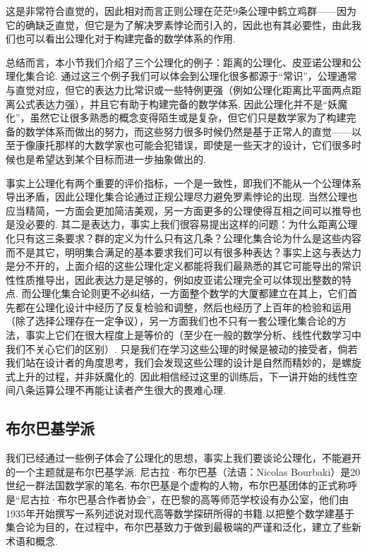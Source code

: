 这是非常符合直觉的，因此相对而言正则公理在茫茫9条公理中鹤立鸡群——因为它的确缺乏直觉，但它是为了解决罗素悖论而引入的，因此也有其必要性，由此我们也可以看出公理化对于构建完备的数学体系的作用.

总结而言，本小节我们介绍了三个公理化的例子：距离的公理化、皮亚诺公理和公理化集合论. 通过这三个例子我们可以体会到公理化很多都源于``常识''，公理通常与直觉对应，但它的表达力比常识或一些特例更强（例如公理化距离比平面两点距离公式表达力强），并且它有助于构建完备的数学体系. 因此公理化并不是``妖魔化''，虽然它让很多熟悉的概念变得陌生或是复杂，但它们只是数学家为了构建完备的数学体系而做出的努力，而这些努力很多时候仍然是基于正常人的直觉——以至于像康托那样的大数学家也可能会犯错误，即使是一些天才的设计，它们很多时候也是希望达到某个目标而进一步抽象做出的.

事实上公理化有两个重要的评价指标，一个是一致性，即我们不能从一个公理体系导出矛盾，因此公理化集合论通过正规公理尽力避免罗素悖论的出现. 当然公理也应当精简，一方面会更加简洁美观，另一方面更多的公理使得互相之间可以推导也是没必要的. 其二是表达力，事实上我们很容易提出这样的问题：为什么距离公理化只有这三条要求？群的定义为什么只有这几条？公理化集合论为什么是这些内容而不是其它，明明集合满足的基本要求我们可以有很多种表达？事实上这与表达力是分不开的，上面介绍的这些公理化定义都能将我们最熟悉的其它可能导出的常识性性质推导出，因此表达力是足够的，例如皮亚诺公理完全可以体现出整数的特点. 而公理化集合论则更不必纠结，一方面整个数学的大厦都建立在其上，它们首先都在公理化设计中经历了反复检验和调整，然后也经历了上百年的检验和运用（除了选择公理存在一定争议），另一方面我们也不只有一套公理化集合论的方法，事实上它们在很大程度上是等价的（至少在一般的数学分析、线性代数学习中我们不关心它们的区别）. 只是我们在学习这些公理的时候是被动的接受者，倘若我们站在设计者的角度思考，我们会发现这些公理的设计是自然而精妙的，是螺旋式上升的过程，并非妖魔化的. 因此相信经过这里的训练后，下一讲开始的线性空间八条运算公理不再能让读者产生很大的畏难心理.

\subsection*{布尔巴基学派}
我们已经通过一些例子体会了公理化的思想，事实上我们要谈论公理化，不能避开的一个主题就是布尔巴基学派. 尼古拉·布尔巴基（法语：Nicolas Bourbaki）是20世纪一群法国数学家的笔名. 布尔巴基是个虚构的人物，布尔巴基团体的正式称呼是“尼古拉·布尔巴基合作者协会”，在巴黎的高等师范学校设有办公室，他们由1935年开始撰写一系列述说对现代高等数学探研所得的书籍.以把整个数学建基于集合论为目的，在过程中，布尔巴基致力于做到最极端的严谨和泛化，建立了些新术语和概念.

